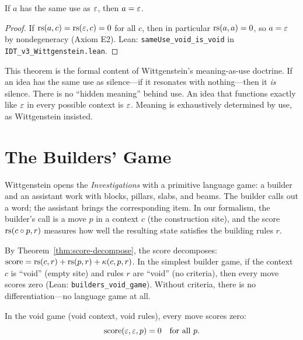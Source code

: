 \begin{theorem}
\label{thm:same-use-void}
If $a$ has the same use as $\varepsilon$, then $a = \varepsilon$.
\end{theorem}

\begin{proof}
If $\mathrm{rs}(a, c) = \mathrm{rs}(\varepsilon, c) = 0$ for all $c$, then in particular
$\mathrm{rs}(a, a) = 0$, so $a = \varepsilon$ by nondegeneracy (Axiom E2).
Lean: \texttt{sameUse\_void\_is\_void} in \texttt{IDT\_v3\_Wittgenstein.lean}.
\end{proof}

\begin{interpretation}
This theorem is the formal content of Wittgenstein's meaning-as-use doctrine.
If an idea has the same use as silence---if it resonates with nothing---then it
\emph{is} silence. There is no ``hidden meaning'' behind use. An idea that
functions exactly like $\varepsilon$ in every possible context is $\varepsilon$. Meaning is
exhaustively determined by use, as Wittgenstein insisted.
\end{interpretation}

\section{The Builders' Game}

\begin{example}
\label{ex:builders}
Wittgenstein opens the \textit{Investigations} with a primitive language game:
a builder and an assistant work with blocks, pillars, slabs, and beams. The
builder calls out a word; the assistant brings the corresponding item. In our
formalism, the builder's call is a move $p$ in a context $c$ (the construction
site), and the score $\mathrm{rs}(c \circ p, r)$ measures how well the resulting
state satisfies the building rules $r$.

By Theorem~\ref{thm:score-decompose}, the score decomposes:
$\mathrm{score} = \mathrm{rs}(c,r) + \mathrm{rs}(p,r) + \kappa(c,p,r)$.
In the simplest builder game, if the context $c$ is ``void'' (empty site) and
rules $r$ are ``void'' (no criteria), then every move scores zero
(Lean: \texttt{builders\_void\_game}). Without criteria, there is no
differentiation---no language game at all.
\end{example}

\begin{theorem}
\label{thm:void-game-trivial}
In the void game (void context, void rules), every move scores zero:
\[
\mathrm{score}(\varepsilon, \varepsilon, p) = 0 \quad \text{for all } p.
\]
\end{theorem}

